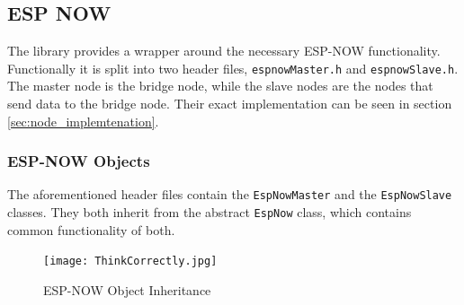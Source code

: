     \subsection{ESP NOW} \label{sec:farilib_espnow}
    The library provides a wrapper around the necessary ESP-NOW functionality.
    Functionally it is split into two header files, \texttt{espnowMaster.h} and 
    \texttt{espnowSlave.h}. The master node is the bridge node, while the slave
    nodes are the nodes that send data to the bridge node. Their exact implementation
    can be seen in section \ref{sec:node_implemtenation}.
        \subsubsection{ESP-NOW Objects}
        The aforementioned header files contain the \texttt{EspNowMaster} and the
        \texttt{EspNowSlave} classes. They both inherit from the abstract 
        \texttt{EspNow} class, which contains common functionality of both.
        \begin{figure}[H]
            \centering
            \texttt{[image: ThinkCorrectly.jpg]}
            \caption{ESP-NOW Object Inheritance}
        \end{figure}

